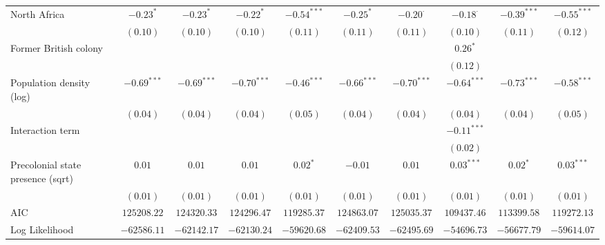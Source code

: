 \begin{sidewaystable}
\begin{center}
{\begin{tabular}{l c c c c c c c c c}
North Africa                          & $-0.23^{*}$   & $-0.23^{*}$   & $-0.22^{*}$   & $-0.54^{***}$   & $-0.25^{*}$   & $-0.20^{\cdot}$ & $-0.18^{\cdot}$ & $-0.39^{***}$ & $-0.55^{***}$ \\
                                      & $(0.10)$      & $(0.10)$      & $(0.10)$      & $(0.11)$        & $(0.11)$      & $(0.11)$        & $(0.10)$        & $(0.11)$      & $(0.12)$      \\
Former British colony                 &               &               &               &                 &               &                 & $0.26^{*}$      &               &               \\
                                      &               &               &               &                 &               &                 & $(0.12)$        &               &               \\
Population density (log)              & $-0.69^{***}$ & $-0.69^{***}$ & $-0.70^{***}$ & $-0.46^{***}$   & $-0.66^{***}$ & $-0.70^{***}$   & $-0.64^{***}$   & $-0.73^{***}$ & $-0.58^{***}$ \\
                                      & $(0.04)$      & $(0.04)$      & $(0.04)$      & $(0.05)$        & $(0.04)$      & $(0.04)$        & $(0.04)$        & $(0.04)$      & $(0.05)$      \\
Interaction term                      &               &               &               &                 &               &                 & $-0.11^{***}$   &               &               \\
                                      &               &               &               &                 &               &                 & $(0.02)$        &               &               \\
Precolonial state presence (sqrt)     & $0.01$        & $0.01$        & $0.01$        & $0.02^{*}$      & $-0.01$       & $0.01$          & $0.03^{***}$    & $0.02^{*}$    & $0.03^{***}$  \\
                                      & $(0.01)$      & $(0.01)$      & $(0.01)$      & $(0.01)$        & $(0.01)$      & $(0.01)$        & $(0.01)$        & $(0.01)$      & $(0.01)$      \\
\midrule
AIC                                   & $125208.22$   & $124320.33$   & $124296.47$   & $119285.37$     & $124863.07$   & $125035.37$     & $109437.46$     & $113399.58$   & $119272.13$   \\
Log Likelihood                        & $-62586.11$   & $-62142.17$   & $-62130.24$   & $-59620.68$     & $-62409.53$   & $-62495.69$     & $-54696.73$     & $-56677.79$   & $-59614.07$   \\

\end{tabular}}
\end{center}
\end{sidewaystable}

